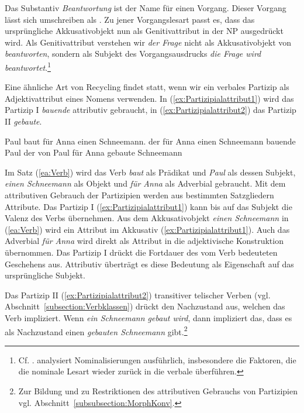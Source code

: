 Das Substantiv \textit{Beantwortung} ist der Name für einen Vorgang. Dieser Vorgang lässt sich umschreiben als . Zu jener Vorgangslesart passt es, dass das ursprüngliche Akkusativobjekt nun als Genitivattribut in der NP ausgedrückt wird. Als Genitivattribut verstehen wir \textit{der Frage} nicht als Akkusativobjekt von \textit{beantworten}, sondern als Subjekt des Vorgangsausdrucks \textit{die Frage wird beantwortet}.\footnote{Cf. \citet[48]{Eichinger1995}. \citet[250--313]{Welke2011} analysiert Nominalisierungen ausführlich, insbesondere die Faktoren, die die nominale Lesart wieder zurück in die verbale überführen.}  

Eine ähnliche Art von Recycling findet statt, wenn wir ein verbales Partizip als Adjektivattribut eines Nomens verwenden. In (\ref{ex:Partizipialattribut1}) wird das Partizip I \textit{bauende} attributiv gebraucht, in (\ref{ex:Partizipialattribut2}) das Partizip II \textit{gebaute}.  

\ea \label{ea:Partizipienableitung}
\ea \label{ea:Verb} Paul baut für Anna einen Schneemann.
\ex \label{ex:Partizipialattribut1} der für Anna einen Schneemann bauende Paul
\ex \label{ex:Partizipialattribut2} der von Paul für Anna gebaute Schneemann
\z 
\z 

Im Satz (\ref{ea:Verb}) wird das Verb \textit{baut} als Prädikat und \textit{Paul} als dessen Subjekt, \textit{einen Schneemann} als Objekt und \textit{für Anna} als Adverbial gebraucht. Mit dem attributiven Gebrauch der Partizipien werden aus bestimmten Satzgliedern Attribute. Das Partizip I (\ref{ex:Partizipialattribut1}) kann bis auf das Subjekt die Valenz des Verbs übernehmen. Aus dem Akkusativobjekt \textit{einen Schneemann} in (\ref{ea:Verb}) wird ein Attribut im Akkusativ (\ref{ex:Partizipialattribut1}). Auch das Adverbial \textit{für Anna} wird direkt als Attribut in die adjektivische Konstruktion übernommen. Das Partizip I drückt die Fortdauer des vom Verb bedeuteten Geschehens aus. Attributiv überträgt es diese Bedeutung als Eigenschaft auf das ursprüngliche Subjekt.

Das Partizip II (\ref{ex:Partizipialattribut2}) transitiver telischer Verben (vgl. Abschnitt~\ref{subsection:Verbklassen}) drückt den Nachzustand aus, welchen das Verb impliziert. Wenn \textit{ein Schneemann gebaut wird}, dann impliziert das, dass es als Nachzustand einen \textit{gebauten Schneemann} gibt.\footnote{Zur Bildung und zu Restriktionen des attributiven Gebrauchs von Partizipien vgl. Abschnitt~\ref{subsubsection:MorphKonv}.} 

